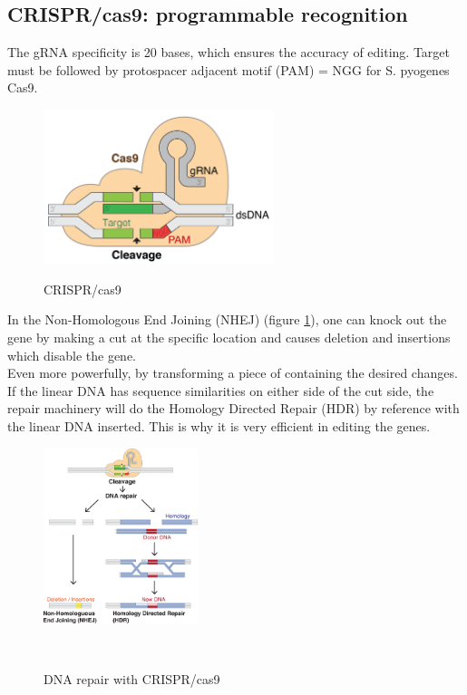 \subsection{CRISPR/cas9: programmable recognition}
The gRNA specificity is 20 bases, which ensures the accuracy of editing. Target must be followed by
protospacer adjacent motif (PAM) = NGG for S. pyogenes Cas9.\\[.2in]
\begin{figure}[h]
\centering
\includegraphics[width=0.6\textwidth]{images/GRNA-Cas9.png}\\[.2in]
\caption{CRISPR/cas9}
\end{figure}
In the Non-Homologous End Joining (NHEJ) (figure \ref{repair}), one can knock out the gene by making a cut at the specific location and causes deletion and insertions which disable the gene.\\[.2in]
Even more powerfully, by transforming a piece of  containing the desired changes. If the linear DNA has sequence similarities on either side of the cut side, the repair machinery will do the Homology Directed Repair (HDR) by reference with the linear DNA inserted. This is why it is very efficient in editing the genes.
\begin{figure}[h]
\centering
\includegraphics[width=0.4\textwidth]{images/DNA_Repair.png}\\[.2in]
\caption{DNA repair with CRISPR/cas9}
\label{repair}\\[.2in]
\end{figure}
